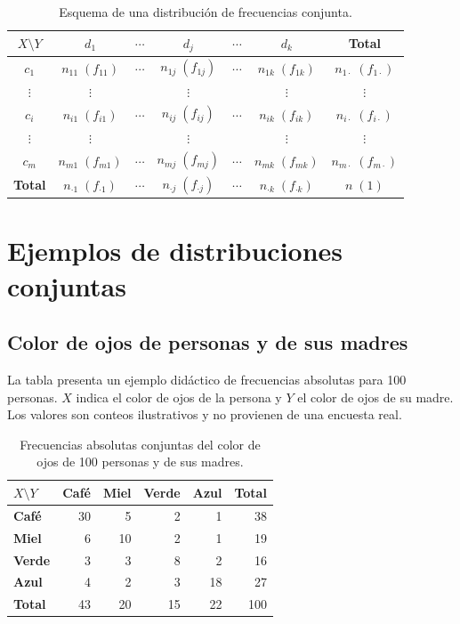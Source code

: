 \begin{table}[H]
\centering
\small
\renewcommand{\arraystretch}{1.2}
\begin{tabular}{|c|c|c|c|c|c|c|}
\hline
$X\setminus Y$ & $d_1$ & $\cdots$ & $d_j$ & $\cdots$ & $d_k$ & \textbf{Total} \\ \hline
$c_1$ & $n_{11}\;(f_{11})$ & $\cdots$ & $n_{1j}\;(f_{1j})$ & $\cdots$ & $n_{1k}\;(f_{1k})$ & $n_{1\cdot}\;(f_{1\cdot})$ \\ \hline
$\vdots$ & $\vdots$ & & $\vdots$ & & $\vdots$ & $\vdots$ \\ \hline
$c_i$ & $n_{i1}\;(f_{i1})$ & $\cdots$ & $n_{ij}\;(f_{ij})$ & $\cdots$ & $n_{ik}\;(f_{ik})$ & $n_{i\cdot}\;(f_{i\cdot})$ \\ \hline
$\vdots$ & $\vdots$ & & $\vdots$ & & $\vdots$ & $\vdots$ \\ \hline
$c_m$ & $n_{m1}\;(f_{m1})$ & $\cdots$ & $n_{mj}\;(f_{mj})$ & $\cdots$ & $n_{mk}\;(f_{mk})$ & $n_{m\cdot}\;(f_{m\cdot})$ \\ \hline
\textbf{Total} & $n_{\cdot1}\;(f_{\cdot1})$ & $\cdots$ & $n_{\cdot j}\;(f_{\cdot j})$ & $\cdots$ & $n_{\cdot k}\;(f_{\cdot k})$ & $n\;(1)$ \\ \hline
\end{tabular}
\caption{Esquema de una distribución de frecuencias conjunta.}
\label{tab:esquema-conjunto}
\end{table}

\section{Ejemplos de distribuciones conjuntas}

\subsection{Color de ojos de personas y de sus madres}

La tabla presenta un ejemplo didáctico de frecuencias absolutas para 100 personas. $X$ indica el color de ojos de la persona y $Y$ el color de ojos de su madre. Los valores son conteos ilustrativos y no provienen de una encuesta real.

\begin{table}[H]
\centering
\small
\renewcommand{\arraystretch}{1.15}
\begin{tabular}{|l|r|r|r|r|r|}
\hline
$X\setminus Y$ & \textbf{Café} & \textbf{Miel} & \textbf{Verde} & \textbf{Azul} & \textbf{Total} \\ \hline
\textbf{Café} & 30 & 5 & 2 & 1 & 38 \\ \hline
\textbf{Miel} & 6 & 10 & 2 & 1 & 19 \\ \hline
\textbf{Verde} & 3 & 3 & 8 & 2 & 16 \\ \hline
\textbf{Azul} & 4 & 2 & 3 & 18 & 27 \\ \hline
\textbf{Total} & 43 & 20 & 15 & 22 & 100 \\ \hline
\end{tabular}
\caption{Frecuencias absolutas conjuntas del color de ojos de 100 personas y de sus madres.}
\label{tab:ojos-personas-madres}
\end{table}

